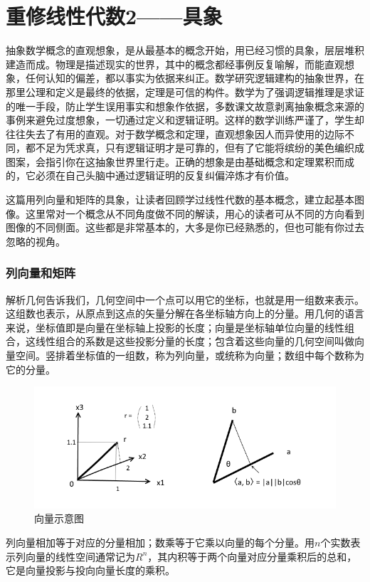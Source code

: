 
\chapter{重修线性代数2——具象}
抽象数学概念的直观想象，是从最基本的概念开始，用已经习惯的具象，层层堆积建造而成。物理是描述现实的世界，其中的概念都经事例反复喻解，而能直观想象，任何认知的偏差，都以事实为依据来纠正。数学研究逻辑建构的抽象世界，在那里公理和定义是最终的依据，定理是可信的构件。数学为了强调逻辑推理是求证的唯一手段，防止学生误用事实和想象作依据，多数课文故意剥离抽象概念来源的事例来避免过度想象，一切通过定义和逻辑证明。这样的数学训练严谨了，学生却往往失去了有用的直观。对于数学概念和定理，直观想象因人而异使用的边际不同，都不足为凭求真，只有逻辑证明才是可靠的，但有了它能将缤纷的美色编织成图案，会指引你在这抽象世界里行走。正确的想象是由基础概念和定理累积而成的，它必须在自己头脑中通过逻辑证明的反复纠偏淬炼才有价值。

这篇用列向量和矩阵的具象，让读者回顾学过线性代数的基本概念，建立起基本图像。这里常对一个概念从不同角度做不同的解读，用心的读者可从不同的方向看到图像的不同侧面。这些都是非常基本的，大多是你已经熟悉的，但也可能有你过去忽略的视角。
\subsection{列向量和矩阵}
解析几何告诉我们，几何空间中一个点可以用它的坐标，也就是用一组数来表示。这组数也表示，从原点到这点的矢量分解在各坐标轴方向上的分量。用几何的语言来说，坐标值即是向量在坐标轴上投影的长度；向量是坐标轴单位向量的线性组合，这线性组合的系数是这些投影分量的长度；包含着这些向量的几何空间叫做向量空间。竖排着坐标值的一组数，称为列向量，或统称为向量；数组中每个数称为它的分量。

\begin{figure}[h]
	\centering
	\includegraphics[width=0.7\linewidth]{pic/153404gr2s818g3sg3g1h9.png}
	\caption{向量示意图}
	\label{fig:153404gr2s818g3sg3g1h9}
\end{figure}


列向量相加等于对应的分量相加；数乘等于它乘以向量的每个分量。用$ n $个实数表示列向量的线性空间通常记为$ R^n $，其内积等于两个向量对应分量乘积后的总和，它是向量投影与投向向量长度的乘积。


